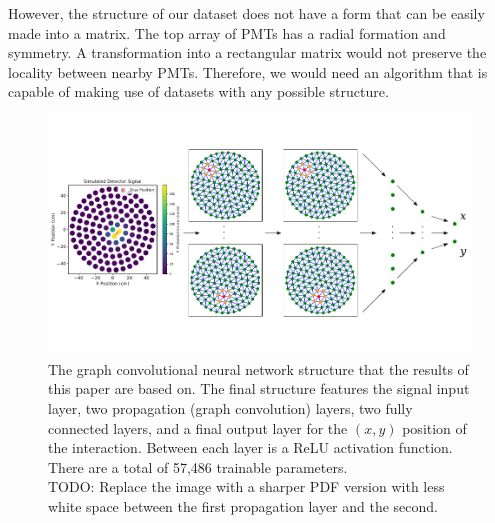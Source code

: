 \documentclass[thesis.tex]{subfiles}
\begin{document}
\par However, the structure of our dataset does not have a form that can be easily made into a matrix.
The top array of PMTs has a radial formation and symmetry.
A transformation into a rectangular matrix would not preserve the locality between nearby PMTs.
Therefore, we would need an algorithm that is capable of making use of datasets with any possible structure.
\begin{figure}[t]
	\centering
	\includegraphics[width=\linewidth]{figures/gcnn_architecture.pdf}
	\caption{
	The graph convolutional neural network structure that the results of this paper are based on.
	The final structure features the signal input layer, two propagation (graph convolution) layers, two fully connected layers, and a final output layer for the $(x,y)$ position of the interaction.
	Between each layer is a ReLU activation function.
	There are a total of 57,486 trainable parameters.
	\\ TODO: Replace the image with a sharper PDF version with less white space between the first propagation layer and the second.
	}
	\label{fig:figures/GCNN_Structure}
\end{figure}
\end{document}

